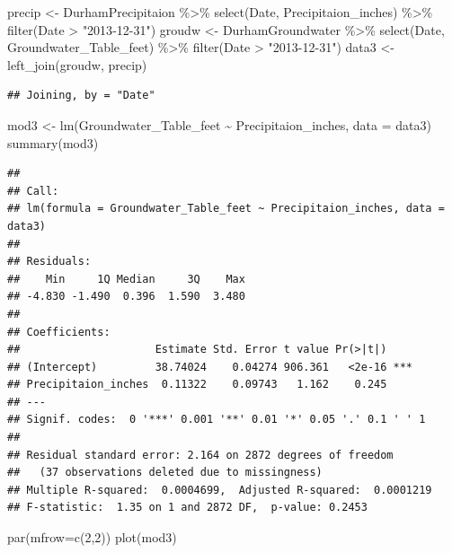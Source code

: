 \documentclass[
  12pt,
]{article}
\newenvironment{Shaded}{\begin{snugshade}}{\end{snugshade}}
\newcommand{\AttributeTok}[1]{\textcolor[rgb]{0.77,0.63,0.00}{#1}}
\newcommand{\DecValTok}[1]{\textcolor[rgb]{0.00,0.00,0.81}{#1}}
\newcommand{\FunctionTok}[1]{\textcolor[rgb]{0.00,0.00,0.00}{#1}}
\newcommand{\NormalTok}[1]{#1}
\newcommand{\OtherTok}[1]{\textcolor[rgb]{0.56,0.35,0.01}{#1}}
\newcommand{\SpecialCharTok}[1]{\textcolor[rgb]{0.00,0.00,0.00}{#1}}
\newcommand{\StringTok}[1]{\textcolor[rgb]{0.31,0.60,0.02}{#1}}
\begin{document}
\begin{Shaded}
\begin{Highlighting}[]
\NormalTok{precip }\OtherTok{\textless{}{-}}\NormalTok{ DurhamPrecipitaion }\SpecialCharTok{\%\textgreater{}\%}
  \FunctionTok{select}\NormalTok{(Date, Precipitaion\_inches) }\SpecialCharTok{\%\textgreater{}\%}
  \FunctionTok{filter}\NormalTok{(Date }\SpecialCharTok{\textgreater{}} \StringTok{"2013{-}12{-}31"}\NormalTok{)}
\NormalTok{groudw }\OtherTok{\textless{}{-}}\NormalTok{ DurhamGroundwater }\SpecialCharTok{\%\textgreater{}\%}
  \FunctionTok{select}\NormalTok{(Date, Groundwater\_Table\_feet) }\SpecialCharTok{\%\textgreater{}\%}
  \FunctionTok{filter}\NormalTok{(Date }\SpecialCharTok{\textgreater{}} \StringTok{"2013{-}12{-}31"}\NormalTok{)}
\NormalTok{data3 }\OtherTok{\textless{}{-}} \FunctionTok{left\_join}\NormalTok{(groudw, precip)}
\end{Highlighting}
\end{Shaded}

\begin{verbatim}
## Joining, by = "Date"
\end{verbatim}

\begin{Shaded}
\begin{Highlighting}[]
\NormalTok{mod3 }\OtherTok{\textless{}{-}} \FunctionTok{lm}\NormalTok{(Groundwater\_Table\_feet }\SpecialCharTok{\textasciitilde{}}\NormalTok{ Precipitaion\_inches, }\AttributeTok{data =}\NormalTok{ data3)}
\FunctionTok{summary}\NormalTok{(mod3)}
\end{Highlighting}
\end{Shaded}

\begin{verbatim}
## 
## Call:
## lm(formula = Groundwater_Table_feet ~ Precipitaion_inches, data = data3)
## 
## Residuals:
##    Min     1Q Median     3Q    Max 
## -4.830 -1.490  0.396  1.590  3.480 
## 
## Coefficients:
##                     Estimate Std. Error t value Pr(>|t|)    
## (Intercept)         38.74024    0.04274 906.361   <2e-16 ***
## Precipitaion_inches  0.11322    0.09743   1.162    0.245    
## ---
## Signif. codes:  0 '***' 0.001 '**' 0.01 '*' 0.05 '.' 0.1 ' ' 1
## 
## Residual standard error: 2.164 on 2872 degrees of freedom
##   (37 observations deleted due to missingness)
## Multiple R-squared:  0.0004699,  Adjusted R-squared:  0.0001219 
## F-statistic:  1.35 on 1 and 2872 DF,  p-value: 0.2453
\end{verbatim}

\begin{Shaded}
\begin{Highlighting}[]
\FunctionTok{par}\NormalTok{(}\AttributeTok{mfrow=}\FunctionTok{c}\NormalTok{(}\DecValTok{2}\NormalTok{,}\DecValTok{2}\NormalTok{))}
\FunctionTok{plot}\NormalTok{(mod3)}
\end{Highlighting}
\end{Shaded}
\end{document}
